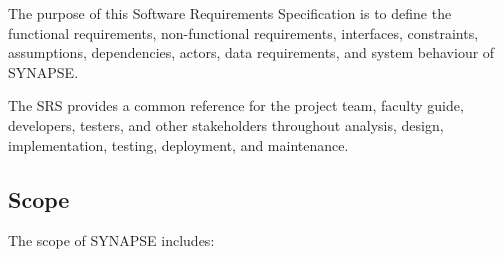\documentclass[11pt,a4paper]{article}
\begin{document}
The purpose of this Software Requirements Specification is to define the functional requirements, non-functional requirements, interfaces, constraints, assumptions, dependencies, actors, data requirements, and system behaviour of SYNAPSE.

The SRS provides a common reference for the project team, faculty guide, developers, testers, and other stakeholders throughout analysis, design, implementation, testing, deployment, and maintenance.


\subsection{Scope}

The scope of SYNAPSE includes:
\end{document}
